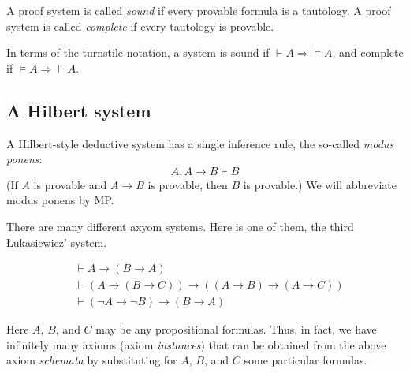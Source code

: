 \begin{page}
\setcounter{section}{2}
\setcounter{subsection}{1}
\setcounter{dfn}{3}
\label{portion:484}

\begin{dfn}
A proof system is called \emph{sound} if every provable formula is a tautology.
A proof system is called \emph{complete} if every tautology is provable.
\end{dfn}

\end{page}

\begin{page}
\setcounter{section}{2}
\setcounter{subsection}{2}
\setcounter{dfn}{3}
\label{portion:485}


In terms of the turnstile notation, a system is sound if $\vdash A \Rightarrow  \vDash A$, and complete if $\vDash A \Rightarrow \vdash A$.



\end{page}

\begin{page}
\setcounter{section}{2}
\setcounter{subsection}{2}
\setcounter{dfn}{3}
\label{portion:487}

\subsection{A Hilbert system}
A Hilbert-style deductive system has a single inference rule, the so-called \emph{modus ponens}:
\[
A, A \to B \vdash B
\]
(If $A$ is provable and $A \to B$ is provable, then $B$ is provable.)
We will abbreviate modus ponens by MP.

There are many different axyom systems.
Here is one of them, the third \L{}ukasiewicz' system.

\begin{align*}
&\vdash A \to (B \to A)\\
&\vdash (A \to (B \to C)) \to ((A \to B) \to (A \to C))\\
&\vdash (\neg A \to \neg B) \to (B \to A)
\end{align*}

Here $A$, $B$, and $C$ may be any propositional formulas.
Thus, in fact, we have infinitely many axioms (axiom \emph{instances}) that can be obtained from the above axiom \emph{schemata}
by substituting for $A$, $B$, and $C$ some particular formulas.


\end{page}

